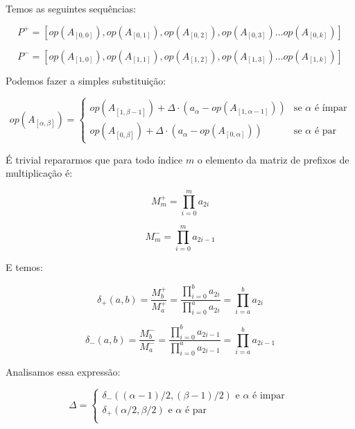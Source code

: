 \documentclass{article}
\begin{document}
Temos as seguintes sequências:

\begin{equation*}
P^{+} = [ op(A_{[0,0]}), op(A_{[0,1]}), op(A_{[0,2]}), op(A_{[0,3]}) \dots op(A_{[0,k]})]
\end{equation*}

\begin{equation*}
P^{-} = [ op(A_{[1,0]}), op(A_{[1,1]}), op(A_{[1,2]}), op(A_{[1,3]}) \dots op(A_{[1,k]})]
\end{equation*}

Podemos fazer a simples substituição:

\begin{equation*}
op(A_{[\alpha, \beta]}) = \begin{cases}
op(A_{[1,\beta-1]}) + \Delta \cdot (a_\alpha - op(A_{[1,\alpha-1]})) & \text{se } \alpha \text{ é ímpar} \\
op(A_{[0,\beta]}) + \Delta \cdot (a_\alpha - op(A_{[0,\alpha]})) & \text{se } \alpha \text{ é par}
\end{cases}
\end{equation*}

É trivial repararmos que para todo índice $m$ o elemento da matriz de prefixos de multiplicação é:

\begin{equation*}
M^{+}_{m} = \prod_{i=0}^{m}{a_{2i}}
\end{equation*}

\begin{equation*}
M^{-}_{m} = \prod_{i=0}^{m}{a_{2i-1}}
\end{equation*}

E temos:

\begin{equation*}
\delta_{+}(a, b) = \frac{M_{b}^{+}}{M_{a}^{+}} = \frac{\prod_{i=0}^{b} a_{2i}}{\prod_{i=0}^{a} a_{2i}} = \prod_{i=a}^{b} a_{2i}
\end{equation*}

\begin{equation*}
\delta_{-}(a, b) = \frac{M_{b}^{-}}{M_{a}^{-}} = \frac{\prod_{i=0}^{b} a_{2i-1}}{\prod_{i=0}^{a} a_{2i-1}} = \prod_{i=a}^{b} a_{2i-1}
\end{equation*}

Analisamos essa expressão:

\begin{equation*}
\Delta = \begin{cases}
\delta_{-}((\alpha-1)/2, (\beta-1)/2) \text{ e } \alpha \text{ é impar } \\
\delta_{+}(\alpha/2, \beta/2) \text{ e } \alpha \text{ é par } \\
\end{cases}
\end{equation*}
\end{document}
